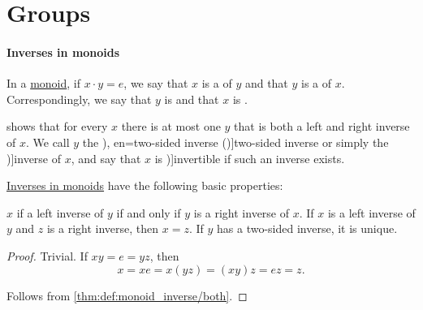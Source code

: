 \section{Groups}\label{sec:groups}

\paragraph{Inverses in monoids}

\begin{definition}\label{def:monoid_inverse}
  In a \hyperref[def:monoid]{monoid}, if \( x \cdot y = e \), we say that \( x \) is a  of \( y \) and that \( y \) is a  of \( x \). Correspondingly, we say that \( y \) is  and that \( x \) is .

   shows that for every \( x \) there is at most one \( y \) that is both a left and right inverse of \( x \). We call \( y \) the \term[ru=двусторонне обратный (\cite[299]{Ляпин1960Полугруппы}), en=two-sided inverse (\cite[84]{Lang2002Algebra})]{two-sided inverse} or simply the \term[ru=обратный (\cite[125]{БелоусовТкачёв2004ДискретнаяМатематика})]{inverse} of \( x \), and say that \( x \) is \term[ru=обратимый (\cite[102]{Мальцев1970АлгебраическиеСистемы})]{invertible} if such an inverse exists.
\end{definition}

\begin{proposition}\label{thm:def:monoid_inverse}
  \hyperref[def:monoid_inverse]{Inverses in monoids} have the following basic properties:
  \begin{thmenum}
     \( x \) if a left inverse of \( y \) if and only if \( y \) is a right inverse of \( x \).
     If \( x \) is a left inverse of \( y \) and \( z \) is a right inverse, then \( x = z \).
     If \( y \) has a two-sided inverse, it is unique.
  \end{thmenum}
\end{proposition}
\begin{proof}
   Trivial.
   If \( xy = e = yz \), then
  \begin{equation*}
    x = xe = x(yz) = (xy)z = ez = z.
  \end{equation*}

   Follows from \cref{thm:def:monoid_inverse/both}.
\end{proof}

